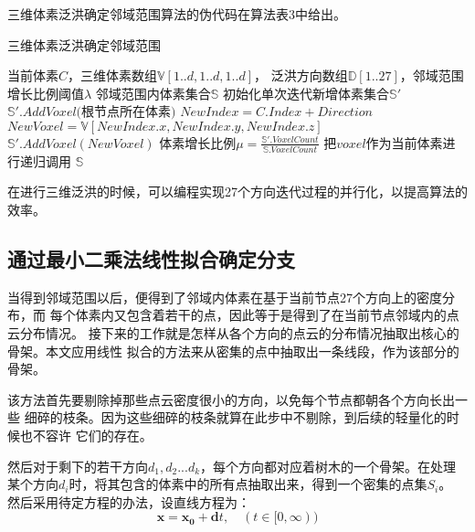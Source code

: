 三维体素泛洪确定邻域范围算法的伪代码在算法表3中给出。
\begin{algorithm}[H] \label{alg:3dfld}
	\caption{三维体素泛洪确定邻域范围}
	\begin{algorithmic}[1]
		\Require 当前体素$C$，三维体素数组$\mathbb{V}[1..d,1..d,1..d]$，
		泛洪方向数组$\mathbb{D}[1..27]$，邻域范围增长比例阈值$\lambda$
		\Ensure	邻域范围内体素集合$\mathbb{S}$
		\State 初始化单次迭代新增体素集合$\mathbb{S'}$
		\State $\mathbb{S'}.AddVoxel($根节点所在体素$)$
			\State $NewIndex = C.Index + Direction$
			\State $NewVoxel = \mathbb{V}[NewIndex.x,NewIndex.y,NewIndex.z]$
				\State $\mathbb{S'}.AddVoxel(NewVoxel)$
			\EndIf
		\EndFor
		\State 体素增长比例$\mu=\frac{\mathbb{S'}.VoxelCount}{\mathbb{S}.VoxelCount}$
		\If{$\mu > \lambda$}
				\State 把$voxel$作为当前体素进行递归调用
			\EndFor
		\EndIf
		\State \Return $\mathbb{S}$
	\end{algorithmic}
\end{algorithm}

在进行三维泛洪的时候，可以编程实现27个方向迭代过程的并行化，以提高算法的效率。

\subsection{通过最小二乘法线性拟合确定分支}
\label{subsec:leastsquares}
当得到邻域范围以后，便得到了邻域内体素在基于当前节点27个方向上的密度分布，而
每个体素内又包含着若干的点，因此等于是得到了在当前节点邻域内的点云分布情况。
接下来的工作就是怎样从各个方向的点云的分布情况抽取出核心的骨架。本文应用线性
拟合的方法来从密集的点中抽取出一条线段，作为该部分的骨架。

该方法首先要剔除掉那些点云密度很小的方向，以免每个节点都朝各个方向长出一些
细碎的枝条。因为这些细碎的枝条就算在此步中不剔除，到后续的轻量化的时候也不容许
它们的存在。

然后对于剩下的若干方向$d_1,d_2...d_k$，每个方向都对应着树木的一个骨架。在处理
某个方向$d_i$时，将其包含的体素中的所有点抽取出来，得到一个密集的点集$S_i$。
然后采用待定方程的办法，设直线方程为：
\begin{equation}
	\mathbf{x} = \mathbf{x_0} + \mathbf{d}t,\quad(t \in [0,\infty))
\end{equation}

